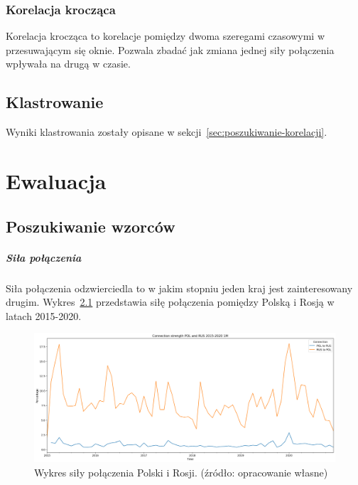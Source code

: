 \documentclass[11pt]{report}
\begin{document}
    \subsection{Korelacja krocząca}
    Korelacja krocząca to korelacje pomiędzy dwoma szeregami czasowymi w przesuwającym się oknie.
    Pozwala zbadać jak zmiana jednej siły połączenia wpływała na drugą w czasie.


    \section{Klastrowanie}
    Wyniki klastrowania zostały opisane w sekcji~\ref{sec:poszukiwanie-korelacji}.


    \chapter{Ewaluacja}\label{ch:ewaluacja}


    \section{Poszukiwanie wzorców}\label{sec:poszukiwanie-wzorców}

    \paragraph{Siła połączenia}
    Siła połączenia odzwierciedla to w jakim stopniu jeden kraj jest zainteresowany drugim.
    Wykres~\ref{fig:POL and RUSconnection 1M} przedstawia siłę połączenia pomiędzy Polską i Rosją w latach 2015-2020.

    \begin{figure}[!ht]
        \centering
        \includegraphics[width=\linewidth]{../spade_proto/figures/symmetry/POL and RUSconnection 1M.png}
        \caption{Wykres siły połączenia Polski i Rosji. (źródło: opracowanie własne)}
        \label{fig:POL and RUSconnection 1M}
    \end{figure}
\end{document}
